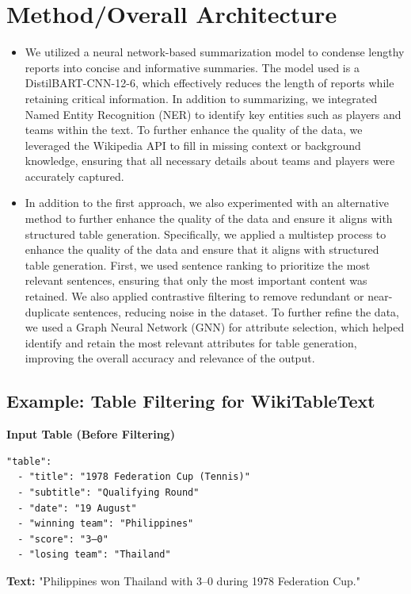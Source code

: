 \documentclass[12pt,a4paper]{article}
\begin{document}
\section*{Method/Overall Architecture}

\begin{itemize}
\item We utilized a neural network-based summarization model to condense lengthy reports into concise and informative summaries. The model used is a DistilBART-CNN-12-6, which effectively reduces the length of reports while retaining critical information. In addition to summarizing, we integrated Named Entity Recognition (NER) to identify key entities such as players and teams within the text. To further enhance the quality of the data, we leveraged the Wikipedia API to fill in missing context or background knowledge, ensuring that all necessary details about teams and players were accurately captured. 
\item In addition to the first approach, we also experimented with an alternative method to further enhance the quality of the data and ensure it aligns with structured table generation. Specifically, we applied a multistep process to enhance the quality of the data and ensure that it aligns with structured table generation. First, we used sentence ranking to prioritize the most relevant sentences, ensuring that only the most important content was retained. We also applied contrastive filtering to remove redundant or near-duplicate sentences, reducing noise in the dataset. To further refine the data, we used a Graph Neural Network (GNN) for attribute selection, which helped identify and retain the most relevant attributes for table generation, improving the overall accuracy and relevance of the output. 
\end{itemize}
\subsection*{Example: Table Filtering for WikiTableText}

\textbf{Input Table (Before Filtering)}  
\begin{verbatim}
"table":  
  - "title": "1978 Federation Cup (Tennis)"  
  - "subtitle": "Qualifying Round"  
  - "date": "19 August"  
  - "winning team": "Philippines"  
  - "score": "3–0"  
  - "losing team": "Thailand"
\end{verbatim}

\textbf{Text:}  
"Philippines won Thailand with 3–0 during 1978 Federation Cup."
\end{document}
